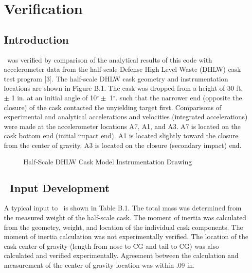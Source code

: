 \chapter{Verification}

\section{Introduction}

     \SLAP\ was verified by comparison of the analytical
results of this code with accelerometer data from the half-scale 
Defense High Level Waste (DHLW)
cask test program [3].  The half-scale DHLW cask geometry and
instrumentation locations are shown in Figure B.1.  
The cask was dropped
from a height of 30 ft. $\pm$ 1 in. at an initial angle of 10$^\circ
\pm$ 1$^\circ$. such that the narrower end (opposite the closure) of
the cask contacted the unyielding target first.  Comparisons of
experimental and analytical accelerations and velocities (integrated
accelerations) were made at the accelerometer locations A7, A1, and
A3.  A7 is located on the cask bottom end (initial impact end).  A1 is
located slightly toward the closure from the center of gravity.  A3 is
located on the closure (secondary impact) end. 

\begin{figure}
\vspace{3.5 in}
\caption{Half-Scale DHLW Cask Model Instrumentation Drawing}
\end{figure}

\section{\SLAP\ Input Development}

      A typical input to \SLAP\ is shown in Table B.1.  The total
mass was determined from the measured weight of the half-scale cask.
The moment of inertia was calculated from the geometry, weight, and
location of the individual cask components.  The moment of inertia
calculation was not experimentally verified.  The location of the cask
center of gravity (length from nose to CG and tail to CG) was also
calculated and verified experimentally.  Agreement between the
calculation and measurement of the center of gravity location was
within .09 in. 

